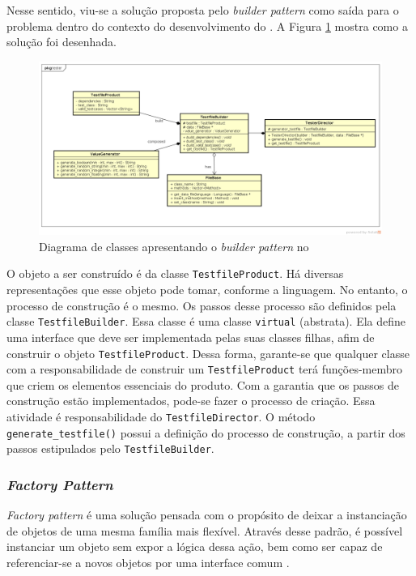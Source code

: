 Nesse sentido, viu-se a solução proposta pelo \textit{builder pattern}
como saída para o problema dentro do contexto do desenvolvimento do
\Scarefault. A Figura \ref{testfile-diagram} mostra como a solução
foi desenhada.

\begin{figure}[h]
  \centering
    \includegraphics[width=\textwidth]{figuras/testfile-diagram.png}
    \caption{Diagrama de classes apresentando o \textit{builder pattern} no \framework}
    \label{testfile-diagram}
\end{figure}
\FloatBarrier

O objeto a ser construído é da classe \lstinline|TestfileProduct|. Há
diversas representações que esse objeto pode tomar, conforme a linguagem.
No entanto, o processo de construção é o mesmo. Os passos desse processo são definidos
pela classe \lstinline|TestfileBuilder|. Essa classe é uma classe
\lstinline|virtual| (abstrata). Ela define uma interface que deve ser
implementada pelas suas classes filhas, afim de construir o objeto
\lstinline|TestfileProduct|. Dessa forma, garante-se que qualquer
classe com a responsabilidade de construir um \lstinline|TestfileProduct|
terá funções-membro que criem os elementos essenciais do produto. Com a garantia
que os passos de construção estão implementados, pode-se fazer o processo de
criação. Essa atividade é responsabilidade do \lstinline|TestfileDirector|. O
método \lstinline|generate_testfile()| possui a definição do processo de
construção, a partir dos passos estipulados pelo \lstinline|TestfileBuilder|.

\subsubsection{\textit{Factory Pattern}} \label{subsec-factory-pattern}
\textit{Factory pattern} é uma solução pensada com o propósito de deixar a
instanciação de objetos de uma mesma família mais flexível. Através desse
padrão,  é possível instanciar um objeto sem expor a lógica dessa ação, bem
como ser capaz de referenciar-se a novos objetos por uma interface comum
\cite{gammaEtAl1994}.

